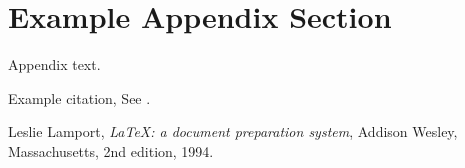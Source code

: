 \documentclass[preprint,12pt,authoryear]{elsarticle}
\begin{document}
\appendix
\section{Example Appendix Section}
\label{app1}

Appendix text.

Example citation, See \citet{lamport94}.




\begin{thebibliography}{00}


  Leslie Lamport,
  \textit{\LaTeX: a document preparation system},
  Addison Wesley, Massachusetts,
  2nd edition,
  1994.

\end{thebibliography}
\end{document}
